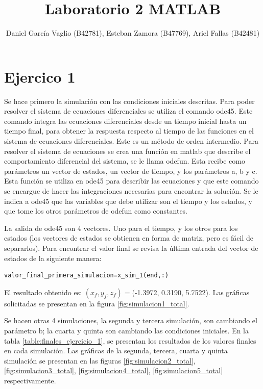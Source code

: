 \documentclass[12pt,letterpaper]{article}
\begin{document}
\title{Laboratorio 2 MATLAB}
\author{Daniel García Vaglio (B42781), Esteban Zamora (B47769), Ariel Fallas (B42481)}
\maketitle

\section{Ejercico 1}
Se hace primero la simulación con las condiciones iniciales descritas. Para poder resolver el sistema de ecuaciones diferenciales se utiliza el comando ode45. Este comando integra las ecuaciones diferenciales desde un tiempo inicial hasta un tiempo final, para obtener la respuesta respecto al tiempo de las funciones en el sistema de ecuaciones diferenciales. Este es un método de orden intermedio. Para resolver el sistema de ecuaciones se crea una función en matlab que describe el comportamiento diferencial del sistema, se le llama odefun. Esta recibe como parámetros un vector de estados, un vector de tiempo, y los parámetros a, b y c. Esta función se utiliza en ode45 para describir las ecuaciones y que este comando se encargue de hacer las integraciones necesarias para encontrar la solución. Se le indica  a ode45 que las variables que debe utilizar son el tiempo y los estados, y que tome los otros parámetros de odefun como constantes. 

La salida de ode45 son 4 vectores. Uno para el tiempo, y los otros para los estados (los vectores de estados se obtienen en forma de matriz, pero es fácil de separarlos). Para encontrar el valor final se revisa la última entrada del vector de estados de la siguiente manera:


\begin{lstlisting}[frame=single]
    valor_final_primera_simulacion=x_sim_1(end,:)
\end{lstlisting}

El resultado obtenido es: $(x_f, y_f, z_f)=$(-1.3972, 0.3190, 5.7522).
Las gráficas solicitadas se presentan en la figura \ref{fig:simulacion1_total}.

Se hacen otras 4 simulaciones, la segunda y tercera simulación, son cambiando el parámetro b; la cuarta y quinta son cambiando las condiciones iniciales. En la tabla \ref{table:finales_ejercicio_1}, se presentan los resultados de los valores finales en cada simulación. Las gráficas de la segunda, tercera, cuarta y quinta simulación se presentan en las figuras \ref{fig:simulacion2_total}, \ref{fig:simulacion3_total}, \ref{fig:simulacion4_total}, \ref{fig:simulacion5_total} respectivamente. 
\end{document}
